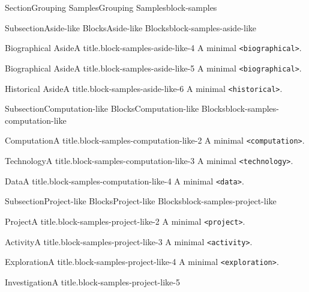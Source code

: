 \documentclass[twoside,10pt,]{article}
\newcommand{\mono}[1]{\texttt{#1}}
\numberwithin{equation}{section}
\begin{document}
\begin{sectionptx}{Section}{Grouping Samples}{}{Grouping Samples}{}{}{block-samples}
\begin{subsectionptx}{Subsection}{Aside-like Blocks}{}{Aside-like Blocks}{}{}{block-samples-aside-like}
\begin{biographical}{Biographical Aside}{A title.}{block-samples-aside-like-4}%
A minimal \mono{<biographical>}.%
\end{biographical}
\begin{biographical}{Biographical Aside}{A title.}{block-samples-aside-like-5}%
A minimal \mono{<biographical>}.%
\end{biographical}
\begin{historical}{Historical Aside}{A title.}{block-samples-aside-like-6}%
A minimal \mono{<historical>}.%
\end{historical}
\end{subsectionptx}
%
%
\typeout{************************************************}
\typeout{************************************************}
%
\begin{subsectionptx}{Subsection}{Computation-like Blocks}{}{Computation-like Blocks}{}{}{block-samples-computation-like}
\begin{computation}{Computation}{A title.}{block-samples-computation-like-2}%
A minimal \mono{<computation>}.%
\end{computation}
\begin{technology}{Technology}{A title.}{block-samples-computation-like-3}%
A minimal \mono{<technology>}.%
\end{technology}
\begin{data}{Data}{A title.}{block-samples-computation-like-4}%
A minimal \mono{<data>}.%
\end{data}
\end{subsectionptx}
%
%
\typeout{************************************************}
\typeout{************************************************}
%
\begin{subsectionptx}{Subsection}{Project-like Blocks}{}{Project-like Blocks}{}{}{block-samples-project-like}
\begin{project}{Project}{A title.}{block-samples-project-like-2}%
A minimal \mono{<project>}.%
\end{project}%
\begin{activity}{Activity}{A title.}{block-samples-project-like-3}%
A minimal \mono{<activity>}.%
\end{activity}%
\begin{exploration}{Exploration}{A title.}{block-samples-project-like-4}%
A minimal \mono{<exploration>}.%
\end{exploration}%
\begin{investigation}{Investigation}{A title.}{block-samples-project-like-5}%

\end{investigation}
\end{subsectionptx}
\end{sectionptx}
\end{document}

